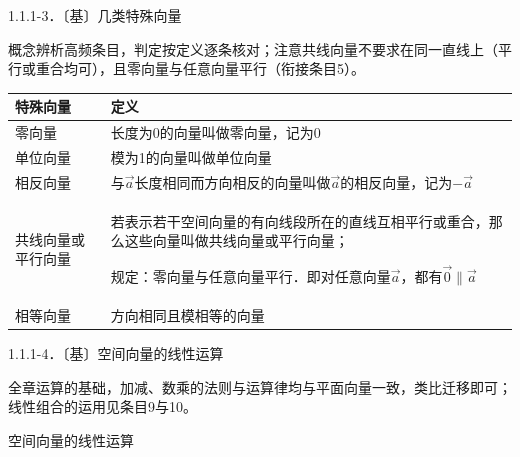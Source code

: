 1.1.1-3．〔基〕几类特殊向量

概念辨析高频条目，判定按定义逐条核对；注意共线向量不要求在同一直线上（平行或重合均可），且零向量与任意向量平行（衔接条目5）。

\begin{table}[!t]\centering\begin{tabular}{@{}
  >{\raggedright\arraybackslash}p{}
  >{\raggedright\arraybackslash}p{}@{}}
\toprule
\begin{minipage}[b]{\linewidth}\raggedright
特殊向量
\end{minipage} & \begin{minipage}[b]{\linewidth}\raggedright
定义
\end{minipage} \\
\midrule
零向量 & 长度为0的向量叫做零向量，记为0 \\
单位向量 & 模为1的向量叫做单位向量 \\
相反向量 &
与\(\overrightarrow{a}\)长度相同而方向相反的向量叫做\(\overrightarrow{a}\)的相反向量，记为\(- \overrightarrow{a}\) \\
共线向量或平行向量 &
若表示若干空间向量的有向线段所在的直线互相平行或重合，那么这些向量叫做共线向量或平行向量；

规定：零向量与任意向量平行．即对任意向量\(\overrightarrow{a}\)，都有\(\overrightarrow{0} \parallel \overrightarrow{a}\) \\
相等向量 & 方向相同且模相等的向量 \\
\bottomrule
\end{tabular}\end{table}

1.1.1-4．〔基〕空间向量的线性运算

全章运算的基础，加减、数乘的法则与运算律均与平面向量一致，类比迁移即可；线性组合的运用见条目9与10。

空间向量的线性运算

